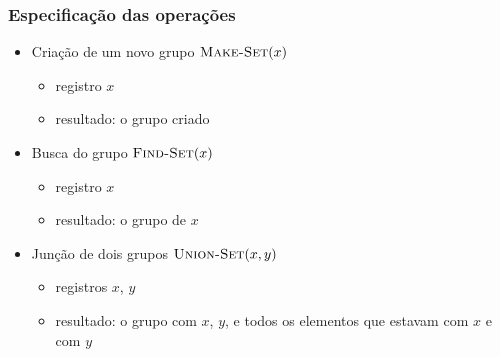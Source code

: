 \documentclass{beamer}
\begin{document}
\begin{frame}
\frametitle{Especificação das operações}

\begin{itemize}

  \item Criação de um novo grupo $\textnormal{\scshape Make-Set}(x)$

    \begin{itemize}

      \item registro $x$

      \item resultado: o grupo criado

    \end{itemize}

  \item Busca do grupo $\textnormal{\scshape Find-Set}(x)$

    \begin{itemize}

      \item registro $x$

      \item resultado: o grupo de $x$

    \end{itemize}
    
  \item Junção de dois grupos $\textnormal{\scshape Union-Set}(x, y)$

    \begin{itemize}

      \item registros $x$, $y$

      \item resultado: o grupo com $x$, $y$, e todos os elementos
        que estavam com $x$ e com $y$

    \end{itemize}

\end{itemize}

\end{frame}
\end{document}
